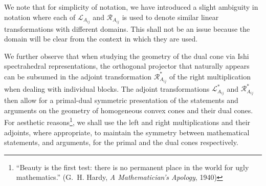 \documentclass[oneside]{amsart}
\theoremstyle{plain}
\theoremstyle{definition}
\theoremstyle{remark}
\numberwithin{equation}{section}
\begin{document}
We note that for simplicity of notation, we have introduced a slight
ambiguity in notation where each of $\mathcal{L}_{A_{ij}}$ and
$\mathcal{R}_{A_{ij}}$ is used to denote similar linear transformations
with different domains. This shall not be an issue because the domain will
be clear from the context in which they are used.

 We further observe that when studying the geometry of the
dual cone via Ishi spectrahedral representations, the orthogonal projector
that naturally appears can be subsumed in the adjoint transformation
$\mathcal{R}^{*}_{A_{ij}}$ of the right multiplication when dealing with
individual blocks. The adjoint transformations $\mathcal{L}^{*}_{A_{ij}}$
and $\mathcal{R}^{*}_{A_{ij}}$ then allow for a primal-dual symmetric
presentation of the statements and arguments on the geometry of homogeneous
convex cones and their dual cones. For aesthetic reasons\footnote{``Beauty
is the first test: there is no permanent place in the world for ugly
mathematics.'' (G.~H. Hardy, \textit{A Mathematician's Apology}, 1940)}, we
shall use the left and right multiplications and their adjoints, where
appropriate, to maintain the symmetry between mathematical statements, and
arguments, for the primal and the dual cones respectively.
\end{document}
